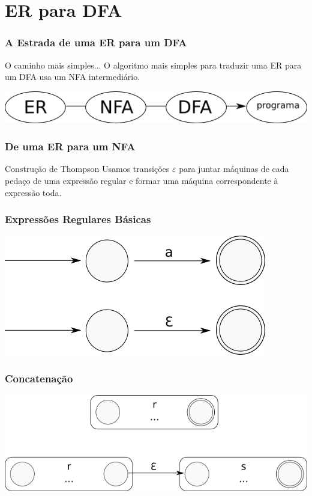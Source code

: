 \documentclass[table]{beamer}
\begin{document}
\section{ER para DFA}
\begin{frame}
   \frametitle{A Estrada de uma ER para um DFA}
   \begin{block}{O caminho mais simples...}
   O algoritmo mais simples para traduzir uma ER para um DFA usa um NFA intermediário.
   \end{block}
   \vspace{1.0cm}
   \includegraphics[width=\linewidth,height=\textheight,keepaspectratio]{figuras/ernfadfa.png}
\end{frame}

\begin{frame}
   \frametitle{De uma ER para um NFA}
   \begin{block}{Construção de Thompson}
   Usamos transições $\varepsilon$ para juntar máquinas de cada pedaço de uma expressão regular e formar uma máquina correspondente à expressão toda.
   \end{block}
\end{frame}

\begin{frame}
   \frametitle{Expressões Regulares Básicas}
   \includegraphics[width=\linewidth,height=\textheight,keepaspectratio]{figuras/erbasica.png}
\end{frame}

\begin{frame}
   \frametitle{Concatenação}
   \includegraphics[width=\linewidth,height=\textheight,keepaspectratio]{figuras/concatenacao.png}
\end{frame}
\end{document}
